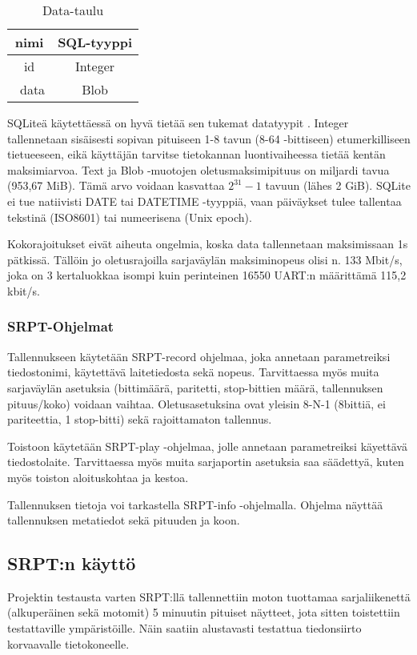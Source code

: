 \vspace{20mm}

\begin{table}[h]
\centering
\caption{Data-taulu}
\begin{tabular}{ c|c }
nimi & SQL-tyyppi \\\toprule
id & Integer \\\
data & Blob \\\bottomrule
\end{tabular}
\end{table}

SQLiteä käytettäessä on hyvä tietää sen tukemat datatyypit \cite{sqlite:datatype3}. Integer tallennetaan sisäisesti sopivan pituiseen 1-8 tavun (8-64 -bittiseen) etumerkilliseen tietueeseen, eikä käyttäjän tarvitse tietokannan luontivaiheessa tietää kentän maksimiarvoa. Text ja Blob -muotojen oletusmaksimipituus on miljardi tavua (953,67 MiB). Tämä arvo voidaan kasvattaa $2^{31}-1$ tavuun (lähes 2 GiB). SQLite ei tue natiivisti DATE tai DATETIME -tyyppiä, vaan päiväykset tulee tallentaa tekstinä (ISO8601) tai numeerisena (Unix epoch).

Kokorajoitukset eivät aiheuta ongelmia, koska data tallennetaan maksimissaan 1s pätkissä. Tällöin jo oletusrajoilla sarjaväylän maksiminopeus olisi n. 133 Mbit/s, joka on 3 kertaluokkaa isompi kuin perinteinen 16550 UART:n määrittämä 115,2 kbit/s.\cite{sqlite:limits}

\subsubsection{SRPT-Ohjelmat}
Tallennukseen käytetään SRPT-record ohjelmaa, joka annetaan parametreiksi tiedostonimi, käytettävä laitetiedosta sekä nopeus. Tarvittaessa myös muita sarjaväylän asetuksia (bittimäärä, paritetti, stop-bittien määrä, tallennuksen pituus/koko) voidaan vaihtaa. Oletusasetuksina ovat yleisin 8-N-1 (8bittiä, ei pariteettia, 1 stop-bitti) sekä rajoittamaton tallennus.

Toistoon käytetään SRPT-play -ohjelmaa, jolle annetaan parametreiksi käyettävä tiedostolaite. Tarvittaessa myös muita sarjaportin asetuksia saa säädettyä, kuten myös toiston aloituskohtaa ja kestoa.

Tallennuksen tietoja voi tarkastella SRPT-info -ohjelmalla. Ohjelma näyttää tallennuksen metatiedot sekä pituuden ja koon.

\subsection{SRPT:n käyttö}
Projektin testausta varten SRPT:llä tallennettiin moton tuottamaa sarjaliikenettä (alkuperäinen sekä motomit) 5 minuutin pituiset näytteet, jota sitten toistettiin testattaville ympäristöille. Näin saatiin alustavasti testattua tiedonsiirto korvaavalle tietokoneelle.

